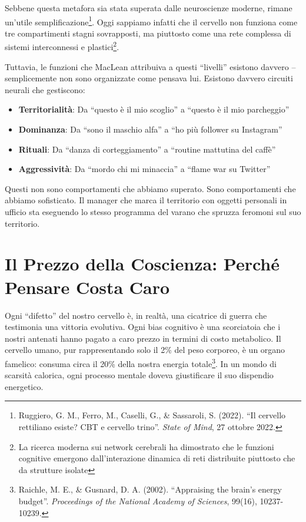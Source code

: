 Sebbene questa metafora sia stata superata dalle neuroscienze moderne, rimane un'utile semplificazione\footnote{Ruggiero, G. M., Ferro, M., Caselli, G., \& Sassaroli, S. (2022). ``Il cervello rettiliano esiste? CBT e cervello trino''. \textit{State of Mind}, 27 ottobre 2022.}. Oggi sappiamo infatti che il cervello non funziona come tre compartimenti stagni sovrapposti, ma piuttosto come una rete complessa di sistemi interconnessi e plastici\footnote{La ricerca moderna sui network cerebrali ha dimostrato che le funzioni cognitive emergono dall'interazione dinamica di reti distribuite piuttosto che da strutture isolate}.

Tuttavia, le funzioni che MacLean attribuiva a questi ``livelli'' esistono davvero – semplicemente non sono organizzate come pensava lui. Esistono davvero circuiti neurali che gestiscono:

\begin{itemize}
\item \textbf{Territorialità}: Da ``questo è il mio scoglio'' a ``questo è il mio parcheggio''
\item \textbf{Dominanza}: Da ``sono il maschio alfa'' a ``ho più follower su Instagram''
\item \textbf{Rituali}: Da ``danza di corteggiamento'' a ``routine mattutina del caffè''
\item \textbf{Aggressività}: Da ``mordo chi mi minaccia'' a ``flame war su Twitter''
\end{itemize}

Questi non sono comportamenti che abbiamo superato. Sono comportamenti che abbiamo sofisticato. Il manager che marca il territorio con oggetti personali in ufficio sta eseguendo lo stesso programma del varano che spruzza feromoni sul suo territorio.

\section{Il Prezzo della Coscienza: Perché Pensare Costa Caro}

Ogni ``difetto'' del nostro cervello è, in realtà, una cicatrice di guerra che testimonia una vittoria evolutiva. Ogni bias cognitivo è una scorciatoia che i nostri antenati hanno pagato a caro prezzo in termini di costo metabolico. Il cervello umano, pur rappresentando solo il 2\% del peso corporeo, è un organo famelico: consuma circa il 20\% della nostra energia totale\footnote{Raichle, M. E., \& Gusnard, D. A. (2002). ``Appraising the brain's energy budget''. \textit{Proceedings of the National Academy of Sciences}, 99(16), 10237-10239.}. In un mondo di scarsità calorica, ogni processo mentale doveva giustificare il suo dispendio energetico.

